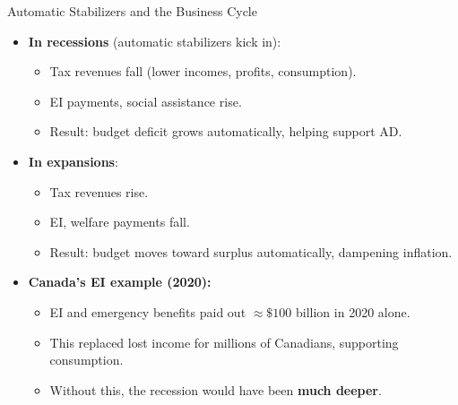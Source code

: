 \documentclass[aspectratio=169]{beamer}
\begin{document}
\begin{frame}{Automatic Stabilizers and the Business Cycle}
\transfade
\begin{itemize}[<+->]
  \item \textbf{In recessions} (automatic stabilizers kick in):
  \begin{itemize}[<+->]
    \item Tax revenues \alert{fall} (lower incomes, profits, consumption).
    \item EI payments, social assistance \alert{rise}.
    \item Result: budget deficit grows automatically, helping support AD.
  \end{itemize}
  \item \textbf{In expansions}:
  \begin{itemize}[<+->]
    \item Tax revenues \alert{rise}.
    \item EI, welfare payments \alert{fall}.
    \item Result: budget moves toward surplus automatically, dampening inflation.
  \end{itemize}
  \item \textbf{Canada's EI example (2020):}
  \begin{itemize}[<+->]
    \item EI and emergency benefits paid out $\approx \$100$ billion in 2020 alone.
    \item This replaced lost income for millions of Canadians, supporting consumption.
    \item Without this, the recession would have been \textbf{much deeper}.
  \end{itemize}
\end{itemize}
\end{frame}
\end{document}
